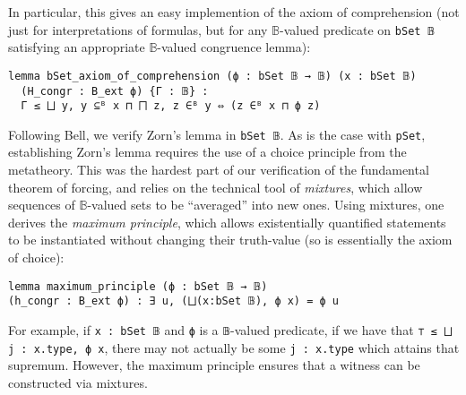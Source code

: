 \documentclass[sigplan,screen]{acmart}
\newcommand{\B}{\mathbb{B}}
\newcommand{\lil}{\lstinline}
\theoremstyle{definition}
\begin{document}
In particular, this gives an easy implemention of the axiom of comprehension (not just for interpretations of formulas, but for any \(\mathbb{B}\)-valued predicate on \lil{bSet 𝔹} satisfying an appropriate \(\mathbb{B}\)-valued congruence lemma): \label{def:comprehension} %
\begin{lstlisting}
lemma bSet_axiom_of_comprehension (ϕ : bSet 𝔹 → 𝔹) (x : bSet 𝔹)
  (H_congr : B_ext ϕ) {Γ : 𝔹} :
  Γ ≤ ⨆ y, y ⊆ᴮ x ⊓ ⨅ z, z ∈ᴮ y ⇔ (z ∈ᴮ x ⊓ ϕ z)
\end{lstlisting}




Following Bell, we verify Zorn's lemma in \lil{bSet 𝔹}.
As is the case with \lil{pSet}, establishing Zorn's lemma requires the use of a choice principle from the metatheory.
This was the hardest part of our verification of the fundamental theorem of forcing, and relies on the technical tool of \emph{mixtures}, which allow sequences of $\B$-valued sets to be ``averaged'' into new ones. Using mixtures, one derives the \emph{maximum principle}, which allows existentially quantified statements to be instantiated without changing their truth-value (so is essentially the axiom of choice):
\begin{lstlisting}
lemma maximum_principle (ϕ : bSet 𝔹 → 𝔹)
(h_congr : B_ext ϕ) : ∃ u, (⨆(x:bSet 𝔹), ϕ x) = ϕ u
\end{lstlisting}
For example, if \lil{x : bSet 𝔹} and \lil{ϕ} is a \lil{𝔹}-valued predicate, if we have that \lil{⊤ ≤ ⨆ j : x.type, ϕ x}, there may not actually be some \lil{j : x.type} which attains that supremum. However, the maximum principle ensures that a witness can be constructed via mixtures.

\end{document}
